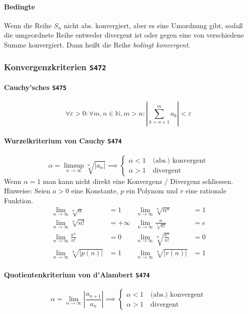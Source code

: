 \documentclass[margin=small, twocolumn]{hsrzf}
\numberwithin{equation}{subsection}
\newcommand{\brpage}[1]{\textcolor{red!70!black}{\small\texttt{S#1}}}
\begin{document}
\paragraph{Bedingte} Wenn die Reihe \(S_n\) nicht abs. konvergiert, aber es eine Umordnung gibt, soda{\ss} die umgeordnete Reihe entweder divergent ist oder gegen eine von verschiedene Summe konvergiert. Dann hei{\ss}t die Reihe \emph{bedingt konvergent}.


\subsubsection{Konvergenzkriterien \brpage{472}}

\paragraph{Cauchy'sches \brpage{475}}
\[
    \forall \varepsilon > 0 : \forall m,n \in \mathbb{N}, m > n:
    \left| \sum_{k=n+1}^m a_k \right| < \varepsilon
\]

\paragraph{Wurzelkriterium von Cauchy \brpage{474}}
\[
    \alpha = \limsup_{n\to\infty} \sqrt[n]{\left| a_n \right|}
    \implies\begin{cases}
        \alpha < 1 \quad \text{(abs.) konvergent} \\
        \alpha > 1 \quad \text{divergent}
    \end{cases}
\]
Wenn \(\alpha = 1\)  man kann nicht direkt eine Konvergenz / Divergenz schliessen. Hinweise: Seien \(a > 0\) eine Konstante, \(p\) ein Polynom und \(r\) eine rationale Funktion.
\begin{align*}
    \lim_{n\to\infty} \sqrt[n]{a} &= 1
    & \lim_{n\to\infty} \sqrt[n]{n^a} &= 1 \\
    \lim_{n\to\infty} \sqrt[n]{n!} &= +\infty
    & \lim_{n\to\infty} \frac{n}{\sqrt[n]{n!}} &= e \\
    \lim_{n\to\infty} \frac{a^n}{n!} &= 0
    & \lim_{n\to\infty} \sqrt[n]{\frac{a^n}{n!}} &= 0 \\
    \lim_{n\to\infty} \sqrt[n]{|p(n)|} &= 1
    & \lim_{n\to\infty} \sqrt[n]{|r(n)|} &= 1
\end{align*}

\paragraph{Quotientenkriterium von d'Alambert \brpage{474}}
\[
    \alpha = \lim_{n\to\infty} \left|\frac{a_{n+1}}{a_n}\right|
    \implies\begin{cases}
        \alpha < 1 \quad \text{(abs.) konvergent} \\
        \alpha > 1 \quad \text{divergent}
    \end{cases}
\]
\end{document}
